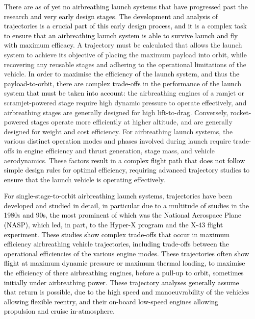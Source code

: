   	\textcolor{black}{There are as of yet no airbreathing launch systems that have progressed past the research and very early design stages\cite{Argus,Powell1991,Trefny1999,Roche2000,Pescetelli2012,Young2006,Bradford2000,Hyperion,Wilhite1991,Fujikawa2017,Mehta2001,Takahashi1997,Aberleen,Germain2001,Eklund2012,Bradford2002,Kimura1999,Preller2018a}. The development and analysis of trajectories is a crucial part of this early design process, and it is a complex task to ensure that an airbreathing launch system is able to survive launch and fly with maximum efficacy.}
  	 A trajectory must be calculated that allows the launch system to achieve its objective of placing the maximum payload into orbit, while recovering any reusable stages and adhering to the operational limitations of the vehicle\cite{Bulirsch1995}.  
  	\textcolor{black}{ In order to maximise the efficiency of the launch system, and thus the payload-to-orbit, there are complex trade-offs in the performance of the launch system that must be taken into account:} the airbreathing engines of a ramjet or scramjet-powered stage require high dynamic pressure to operate effectively, and airbreathing stages are generally designed for high lift-to-drag. Conversely, rocket-powered stages operate more efficiently at higher altitude, and are generally designed for weight and cost efficiency. For airbreathing launch systems, the various \textcolor{black}{distinct operation modes and phases involved} during launch require trade-offs in engine efficiency and thrust generation, stage mass, and vehicle aerodynamics. These factors \textcolor{black}{result in a complex flight path that does not follow simple design rules for optimal efficiency, requiring advanced trajectory studies to ensure that the launch vehicle is operating effectively.}
  	 
  
  	 \textcolor{black}{
  	   For single-stage-to-orbit airbreathing launch systems, trajectories have been developed and studied in detail\cite{Argus,Powell1991,Trefny1999,Roche2000,Pescetelli2012,Young2006,Bradford2000,Hyperion}, in particular due to a multitude of studies in the 1980s and 90s, the most prominent of which was the National Aerospace Plane (NASP), which led, in part, to the Hyper-X program and the X-43 flight experiment\cite{Mcclinton2008}. These studies show complex trade-offs that occur in maximum efficiency airbreathing vehicle trajectories, including trade-offs between the operational efficiencies of the various engine modes. These trajectories often show flight at maximum dynamic pressure or maximum thermal loading, to maximise the efficiency of there airbreathing engines, before a pull-up to orbit, sometimes initially under airbreathing power. These trajectory analyses generally assume that return is possible, due to the high speed and manoeuvrability of the vehicles allowing flexible reentry, and their on-board low-speed engines allowing propulsion and cruise in-atmosphere. 
  	}
  	
